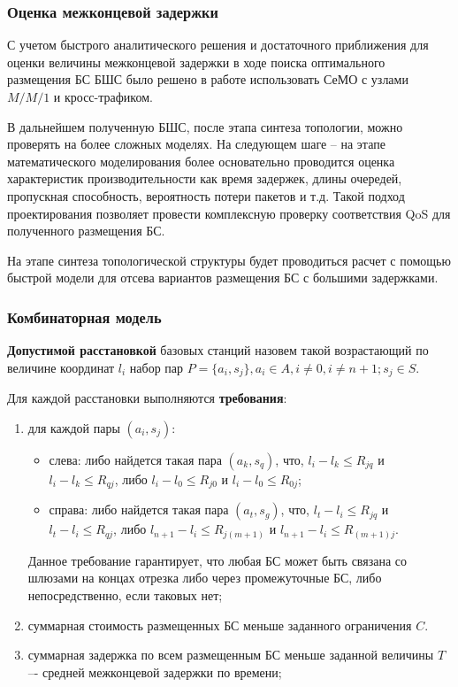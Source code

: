 \begin{frame}
    \justifying
    \frametitle{Оценка межконцевой задержки}
    \fontsize{8pt}{7.2}\selectfont

    С учетом быстрого аналитического решения и достаточного приближения для оценки величины межконцевой задержки в ходе поиска оптимального размещения БС БШС было решено в работе использовать СеМО с узлами $M/M/1$ и кросс-трафиком.

    \bigskip
    В дальнейшем полученную БШС, после этапа синтеза топологии, можно проверять на более сложных моделях. На следующем шаге -- на этапе математического моделирования более основательно проводится оценка характеристик производительности как время задержек, длины очередей, пропускная способность, вероятность потери пакетов и т.д. Такой подход проектирования позволяет провести комплексную проверку соответствия QoS для полученного размещения БС. 
    
    \bigskip
    На этапе синтеза топологической структуры будет проводиться расчет с помощью быстрой модели для отсева вариантов размещения БС с большими задержками.


\end{frame}

\begin{frame}
    \frametitle{Комбинаторная модель}
    \justifying
    \textbf{Допустимой расстановкой} базовых станций назовем такой возрастающий по величине координат $l_i$  набор пар $P = \{a_i, s_j\},a_i \in A,i \neq 0,i \neq n+1;s_j \in S$.

    Для каждой расстановки выполняются \textbf{требования}:

    \begin{enumerate}
        \item  для каждой пары $(a_i,s_j)$:
            \begin{itemize}
                \item слева: либо найдется такая пара $(a_k,s_q)$, что, $l_i - l_k \leqslant R_{jq}$  и $l_i - l_k  \leqslant R_{qj}$, либо $l_i-l_0 \leqslant R_{j0}$ и $l_i - l_0 \leqslant R_{0j}$;
                \item справа: либо найдется такая пара $(a_t,s_g)$, что, $l_t-l_i \leqslant R_{jq}$ и $l_t - l_i \leqslant R_{qj}$, либо $l_{n+1}-l_i \leqslant R_{j(m+1)}$ и $l_{n+1}-l_i \leqslant R_{(m+1)j}$. 
            \end{itemize}
    Данное требование гарантирует, что любая БС может быть связана со шлюзами на концах отрезка либо через промежуточные БС, либо непосредственно, если таковых нет;
        \item суммарная стоимость размещенных БС меньше заданного ограничения  $C$.
        \item суммарная задержка по всем размещенным БС меньше заданной величины $T$ –- средней межконцевой задержки по времени;
    \end{enumerate}

\end{frame}

